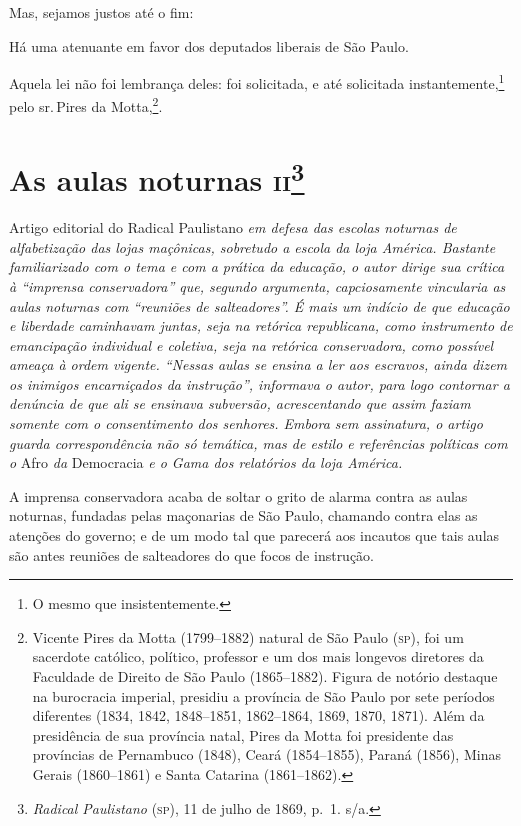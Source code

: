 \noindent\dotfill

Mas, sejamos justos até o fim:

Há uma atenuante em favor dos deputados liberais de São Paulo.

Aquela lei não foi lembrança deles: foi solicitada, e até solicitada
instantemente,\footnote{O mesmo que insistentemente.} pelo sr.\,Pires
da Motta,\footnote{Vicente Pires da Motta (1799--1882) natural de São
  Paulo (\textsc{sp}), foi um sacerdote católico, político, professor e um dos
  mais longevos diretores da Faculdade de Direito de São Paulo
  (1865--1882). Figura de notório destaque na burocracia imperial,
  presidiu a província de São Paulo por sete períodos diferentes (1834,
  1842, 1848--1851, 1862--1864, 1869, 1870, 1871). Além da presidência de
  sua província natal, Pires da Motta foi presidente das províncias de
  Pernambuco (1848), Ceará (1854--1855), Paraná (1856), Minas Gerais
  (1860--1861) e Santa Catarina (1861--1862).}.

\chapter{As aulas noturnas \textsc{ii}\footnote{\emph{Radical Paulistano}
  (\textsc{sp}), 11 de julho de 1869, p.~1. s/a.}}

\begin{didascalia}
Artigo editorial do Radical Paulistano \emph{em defesa das escolas
noturnas de alfabetização das lojas maçônicas, sobretudo a escola da
loja América. Bastante familiarizado com o tema e com a prática da
educação, o autor dirige sua crítica à ``imprensa conservadora'' que,
segundo argumenta, capciosamente vincularia as aulas noturnas com
``reuniões de salteadores''. É mais um indício de que educação e liberdade
caminhavam juntas, seja na retórica republicana, como instrumento de
emancipação individual e coletiva, seja na retórica conservadora, como
possível ameaça à ordem vigente. ``Nessas aulas se ensina a ler aos
escravos, ainda dizem os inimigos encarniçados da instrução'', informava
o autor, para logo contornar a denúncia de que ali se ensinava
subversão, acrescentando que assim faziam somente com o consentimento
dos senhores. Embora sem assinatura, o artigo guarda correspondência não
só temática, mas de estilo e referências políticas com o} Afro \emph{da}
Democracia \emph{e o Gama dos relatórios da loja América.}
\end{didascalia}

A imprensa conservadora acaba de soltar o grito de alarma contra as
aulas noturnas, fundadas pelas maçonarias de São Paulo, chamando contra
elas as atenções do governo; e de um modo tal que parecerá aos incautos
que tais aulas são antes reuniões de salteadores do que focos de
instrução.


